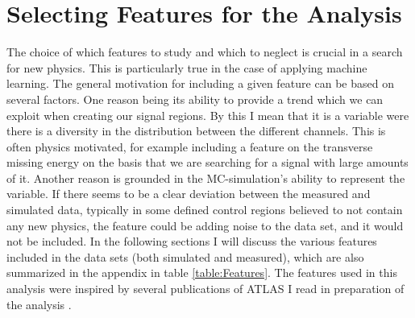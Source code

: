 \section{Selecting Features for the Analysis}\label{sec:Feats}
The choice of which features to study and which to neglect is crucial in a search for new physics. This is particularly true 
in the case of applying machine learning. The general motivation for including a given feature can be based on several factors. 
One reason being its ability to provide a trend which we can exploit when creating our signal regions. By this I mean
that it is a variable were there is a diversity in the distribution between the different channels. This is often physics motivated, for example 
including a feature on the transverse missing energy on the basis that we are searching for a signal with large amounts of it. 
Another reason is grounded in the \ac{MC}-simulation's ability to represent the variable. If there seems to be a clear deviation between the 
measured and simulated data, typically in some defined control regions believed to not contain any new physics, the feature could be adding noise 
to the data set, and it would not be included. In the following sections I will discuss the various features included in the data sets (both simulated and measured), 
which are also summarized in the appendix in table \ref{table:Features}. The features used in this analysis were inspired by several publications of \ac{ATLAS} I read in 
preparation of the analysis \cite{franchini_search_2019, atlas_search_2021}.